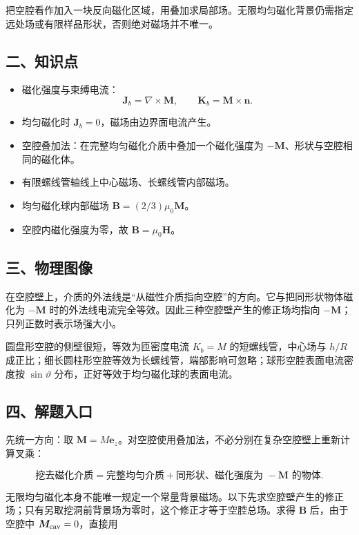 \documentclass[12pt,a4paper,UTF8]{ctexart}
\newcommand{\tightlist}{\setlength{\itemsep}{0pt}\setlength{\parskip}{0pt}}
\begin{document}
把空腔看作加入一块反向磁化区域，用叠加求局部场。无限均匀磁化背景仍需指定远处场或有限样品形状，否则绝对磁场并不唯一。

\subsection{二、知识点}\label{ux4e8cux77e5ux8bc6ux70b9-2}

\begin{itemize}
\tightlist
\item
  磁化强度与束缚电流：
  \[\bm J_b=\nabla\times\bm M,\qquad \bm K_b=\bm M\times\bm n.\]
\item
  均匀磁化时 \(\bm J_b=0\)，磁场由边界面电流产生。
\item
  空腔叠加法：在完整均匀磁化介质中叠加一个磁化强度为
  \(-\bm M\)、形状与空腔相同的磁化体。
\item
  有限螺线管轴线上中心磁场、长螺线管内部磁场。
\item
  均匀磁化球内部磁场 \(\bm B=(2/3)\mu_0\bm M\)。
\item
  空腔内磁化强度为零，故 \(\bm B=\mu_0\bm H\)。
\end{itemize}

\subsection{三、物理图像}\label{ux4e09ux7269ux7406ux56feux50cf-2}

在空腔壁上，介质的外法线是``从磁性介质指向空腔''的方向。它与把同形状物体磁化为
\(-\bm M\) 时的外法线电流完全等效。因此三种空腔壁产生的修正场均指向
\(-\bm M\)；只列正数时表示场强大小。

圆盘形空腔的侧壁很短，等效为匝密度电流 \(K_b=M\) 的短螺线管，中心场与
\(h/R\)
成正比；细长圆柱形空腔等效为长螺线管，端部影响可忽略；球形空腔表面电流密度按
\(\sin\vartheta\) 分布，正好等效于均匀磁化球的表面电流。

\subsection{四、解题入口}\label{ux56dbux89e3ux9898ux5165ux53e3-2}

先统一方向：取
\(\bm M=M\bm e_z\)。对空腔使用叠加法，不必分别在复杂空腔壁上重新计算叉乘：

\[\text{挖去磁化介质}=\text{完整均匀介质}+\text{同形状、磁化强度为 }-\bm M\text{ 的物体}.\]

无限均匀磁化本身不能唯一规定一个常量背景磁场。以下先求空腔壁产生的修正场；只有另取挖洞前背景场为零时，这个修正才等于空腔总场。求得
\(\bm B\) 后，由于空腔中 \(\bm M_{\rm cav}=0\)，直接用
\end{document}

